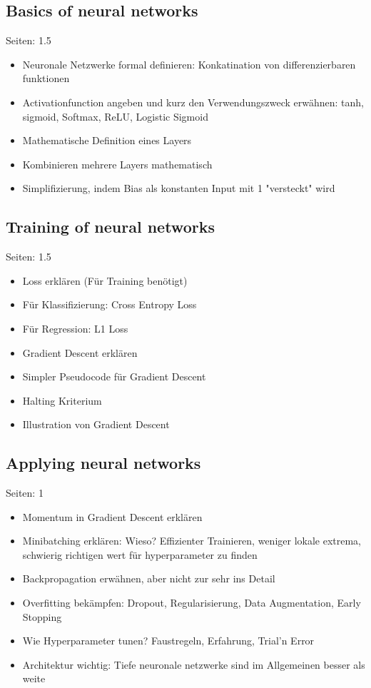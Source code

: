\documentclass[draft,final,oneside]{vutinfth} %
\begin{document}
\subsection{Basics of neural networks}
Seiten: 1.5
\begin{itemize}
\item Neuronale Netzwerke formal definieren: Konkatination von differenzierbaren funktionen
\item Activationfunction angeben und kurz den Verwendungszweck erwähnen: tanh, sigmoid, Softmax, ReLU, Logistic Sigmoid
\item Mathematische Definition eines Layers
\item Kombinieren mehrere Layers mathematisch
\item Simplifizierung, indem Bias als konstanten Input mit 1 "versteckt" wird

\end{itemize}

\subsection{Training of neural networks}
Seiten: 1.5
\begin{itemize}
\item Loss erklären (Für Training benötigt)
\item Für Klassifizierung: Cross Entropy Loss
\item Für Regression: L1 Loss
\item Gradient Descent erklären
\item Simpler Pseudocode für Gradient Descent
\item Halting Kriterium
\item Illustration von Gradient Descent

\end{itemize}

\subsection{Applying neural networks}
Seiten: 1
\begin{itemize}

\item Momentum in Gradient Descent erklären
\item Minibatching erklären: Wieso? Effizienter Trainieren, weniger lokale extrema, schwierig richtigen wert für hyperparameter zu finden
\item Backpropagation erwähnen, aber nicht zur sehr ins Detail
\item Overfitting bekämpfen: Dropout, Regularisierung, Data Augmentation, Early Stopping
\item Wie Hyperparameter tunen? Faustregeln, Erfahrung, Trial'n Error
\item Architektur wichtig: Tiefe neuronale netzwerke sind im Allgemeinen besser als weite

\end{itemize}
\end{document}
